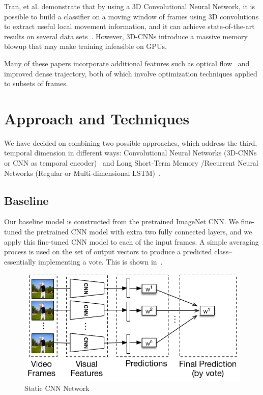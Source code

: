 Tran, et al. demonstrate that by using a 3D Convolutional Neural Network, it is possible to build a classifier on a moving window of frames using 3D convolutions to extract useful local movement information, and it can achieve state-of-the-art results on several data sets~\cite{stf}. However, 3D-CNNs introduce a massive memory blowup that may make training infeasible on GPUs.

Many of these papers incorporate additional features such as optical flow~\cite{brox} and improved dense trajectory, both of which involve optimization techniques applied to subsets of frames. 

\section{Approach and Techniques}
We have decided on combining two possible approaches, which address
the third, temporal dimension in different ways: Convolutional Neural
Networks (3D-CNNs or CNN as temporal encoder)~\cite{stf,cnnvid,cnnMNLS} and Long
Short-Term Memory /Recurrent Neural Networks (Regular or Multi-dimensional LSTM)~\cite{ltrcn}. 

\subsection{Baseline}
Our baseline model is constructed from the pretrained ImageNet CNN. We fine-tuned the pretrained CNN model with extra two fully connected layers, and we apply this fine-tuned CNN model to each of the input frames. A simple averaging process is used on the set of output vectors to produce a predicted class-- essentially implementing a vote. This is shown in~. 
\begin{figure}
  \centering
  \includegraphics[width=1.0\linewidth]{figs/cnn}
  \caption{Static CNN Network}
  \label{fig:cnn}
\end{figure}

